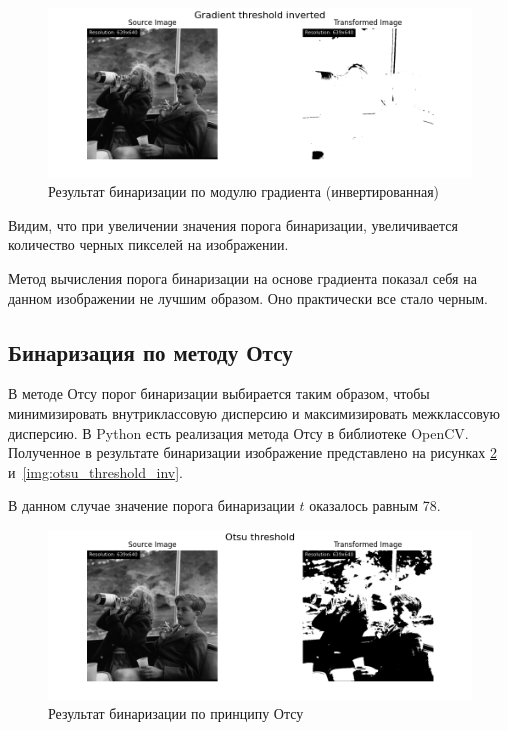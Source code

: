 \begin{figure}[ht!]
    \centering
    \includegraphics[width=\textwidth]{../results/Gradient threshold inverted.png}
    \caption{Результат бинаризации по модулю градиента (инвертированная)}
    \label{img:binarization_gradient_inv}
\end{figure}

Видим, что при увеличении значения порога бинаризации, увеличивается количество черных пикселей на изображении.

Метод вычисления порога бинаризации на основе градиента показал себя на данном изображении не лучшим образом. Оно практически все стало черным. 

\FloatBarrier
\subsection{Бинаризация по методу Отсу}

В методе Отсу порог бинаризации выбирается таким образом, чтобы минимизировать внутриклассовую дисперсию и максимизировать межклассовую дисперсию.
В Python есть реализация метода Отсу в библиотеке OpenCV. Полученное в результате бинаризации изображение представлено на рисунках \ref{img:otsu_threshold} и~\ref{img:otsu_threshold_inv}.

В данном случае значение порога бинаризации $t$ оказалось равным 78.
\begin{figure}[ht!]
    \centering
    \includegraphics[width=\textwidth]{../results/Otsu threshold.png}
    \caption{Результат бинаризации по принципу Отсу}
    \label{img:otsu_threshold}
\end{figure}

